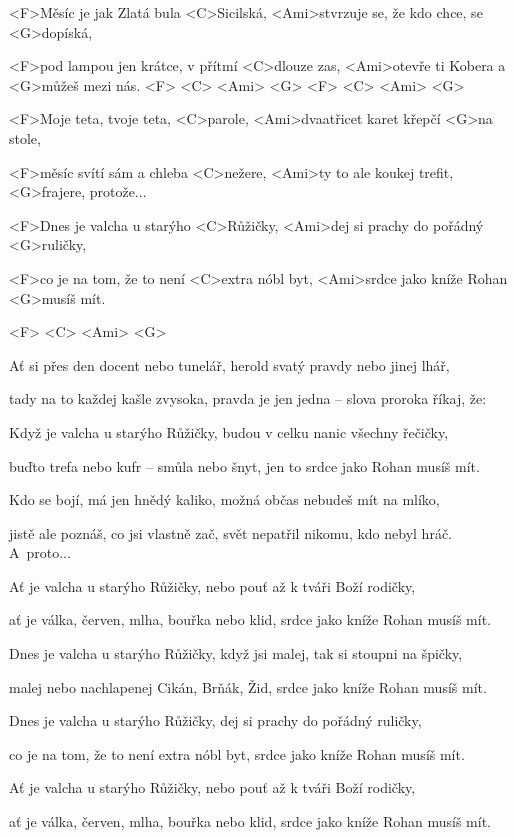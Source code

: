 

\zs
<F>Měsíc je jak Zlatá bula <C>Sicilská,
<Ami>stvrzuje se, že kdo chce, se <G>dopíská,

<F>pod lampou jen krátce, v přítmí <C>dlouze zas,
<Ami>otevře ti Kobera a <G>můžeš mezi nás.
<F> <C> <Ami> <G> <F> <C> <Ami> <G>
\ks

\zs
<F>Moje teta, tvoje teta, <C>parole,
<Ami>dvaatřicet karet křepčí <G>na stole,

<F>měsíc svítí sám a chleba <C>nežere,
<Ami>ty to ale koukej trefit, <G>frajere, protože...
\ks

\zr
<F>Dnes je valcha u starýho <C>Růžičky,
<Ami>dej si prachy do pořádný <G>ruličky,

<F>co je na tom, že to není <C>extra nóbl byt,
<Ami>srdce jako kníže Rohan <G>musíš mít.

<F> <C> <Ami> <G>
\kr

\zs
Ať si přes den docent nebo tunelář,
herold svatý pravdy nebo jinej lhář,

tady na to každej kašle zvysoka,
pravda je jen jedna -- slova proroka říkaj, že:
\ks

\zr
Když je valcha u starýho Růžičky,
budou v celku nanic všechny řečičky,

buďto trefa nebo kufr -- smůla nebo šnyt,
jen to srdce jako Rohan musíš mít.
\kr

\zs
Kdo se bojí, má jen hnědý kaliko,
možná občas nebudeš mít na mlíko,

jistě ale poznáš, co jsi vlastně zač,
svět nepatřil nikomu, kdo nebyl hráč.
A~proto...
\ks

\zr
Ať je valcha u starýho Růžičky,
nebo pouť až k tváři Boží rodičky,

ať je válka, červen, mlha, bouřka nebo klid,
srdce jako kníže Rohan musíš mít.
\kr

\zr
Dnes je valcha u starýho Růžičky,
když jsi malej, tak si stoupni na špičky,

malej nebo nachlapenej Cikán, Brňák, Žid,
srdce jako kníže Rohan musíš mít.
\kr

\zr
Dnes je valcha u starýho Růžičky,
dej si prachy do pořádný ruličky,

co je na tom, že to není extra nóbl byt,
srdce jako kníže Rohan musíš mít.
\kr

\zr
Ať je valcha u starýho Růžičky,
nebo pouť až k tváři Boží rodičky,

ať je válka, červen, mlha, bouřka nebo klid,
srdce jako kníže Rohan musíš mít.
\kr

\kp
